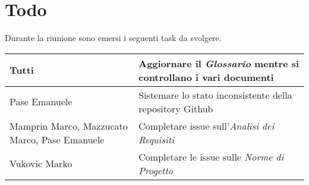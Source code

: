\section{Todo}
Durante la riunione sono emersi i seguenti task da svolgere.

\begin{center}
  \begin{tabular}{|p{5cm}|p{7cm}|}
    \hline
    Tutti & Aggiornare il \textit{Glossario} mentre si controllano i vari documenti\\ \hline
    Pase Emanuele & Sistemare lo stato inconsistente della repository Github\\ \hline
    Mamprin Marco, Mazzucato Marco, Pase Emanuele & Completare issue sull'\textit{Analisi dei Requisiti}\\ \hline
    Vukovic Marko & Completare le issue sulle \textit{Norme di Progetto}\\ \hline
  \end{tabular}
\end{center}
